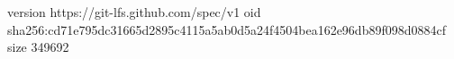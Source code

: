 version https://git-lfs.github.com/spec/v1
oid sha256:cd71e795dc31665d2895c4115a5ab0d5a24f4504bea162e96db89f098d0884cf
size 349692
